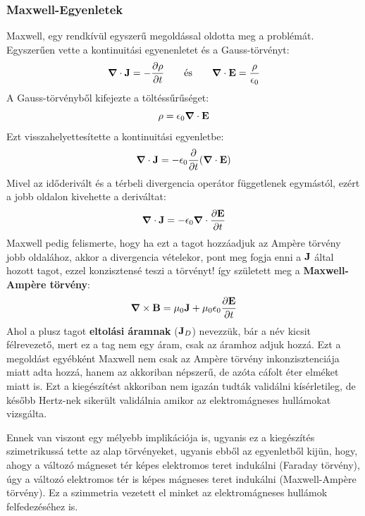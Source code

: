 \documentclass[a4paper,12pt]{article}
\begin{document}
\subsubsection{Maxwell-Egyenletek}
Maxwell, egy rendkívül egyszerű megoldással oldotta meg a problémát. Egyszerűen vette a kontinuitási egyenenletet és a Gauss-törvényt:
\begin{equation}
    \boldsymbol{\nabla} \cdot \bold{J} = - \frac{\partial \rho}{\partial t} \qquad \text{és} \qquad \boldsymbol{\nabla} \cdot \bold{E} = \frac{\rho}{\epsilon_0}
\end{equation}
A Gauss-törvényből kifejezte a töltéssűrűséget:
\begin{equation}
    \rho = \epsilon_0 \boldsymbol{\nabla} \cdot \bold{E}
\end{equation}
Ezt visszahelyettesítette a kontinuitási egyenletbe:
\begin{equation}
    \boldsymbol{\nabla} \cdot \bold{J} = - \epsilon_0 \frac{\partial }{\partial t} (\boldsymbol{\nabla} \cdot \bold{E})
\end{equation}
Mivel az időderivált és a térbeli divergencia operátor függetlenek egymástól, ezért a jobb oldalon kivehette a deriváltat:
\begin{equation}
    \boldsymbol{\nabla} \cdot \bold{J} = - \epsilon_0 \boldsymbol{\nabla} \cdot \frac{\partial \bold{E}}{\partial t}
\end{equation}
Maxwell pedig felismerte, hogy ha ezt a tagot hozzáadjuk az Ampère törvény jobb oldalához, akkor a divergencia vételekor, pont meg fogja enni a $\bold{J}$ által hozott tagot, ezzel konzisztensé teszi a törvényt!
így született meg a \textbf{Maxwell-Ampère törvény}:
\begin{equation}
    \boldsymbol{\nabla} \times \bold{B} = \mu_0 \bold{J} + \mu_0 \epsilon_0 \frac{\partial \bold{E}}{\partial t}
\end{equation}
Ahol a plusz tagot \textbf{eltolási áramnak} ($\bold{J}_D$) nevezzük, bár a név kicsit félrevezető, mert ez a tag nem egy áram, csak az áramhoz adjuk hozzá.
Ezt a megoldást egyébként Maxwell nem csak az Ampère törvény inkonzisztenciája miatt adta hozzá, hanem az akkoriban népszerű, de azóta cáfolt éter elméket miatt is.
Ezt a kiegészítést akkoriban nem igazán tudták validálni kísérletileg, de később Hertz-nek sikerült validálnia amikor az elektromágneses hullámokat vizsgálta.

Ennek van viszont egy mélyebb implikációja is, ugyanis ez a kiegészítés szimetrikussá tette az alap törvényeket, ugyanis ebből az egyenletből kijün, hogy, ahogy a változó mágneset tér képes elektromos teret
indukálni (Faraday törvény), úgy a változó elektromos tér is képes mágneses teret indukálni (Maxwell-Ampère törvény). Ez a szimmetria vezetett el minket az elektromágneses hullámok felfedezéséhez is.
\end{document}
